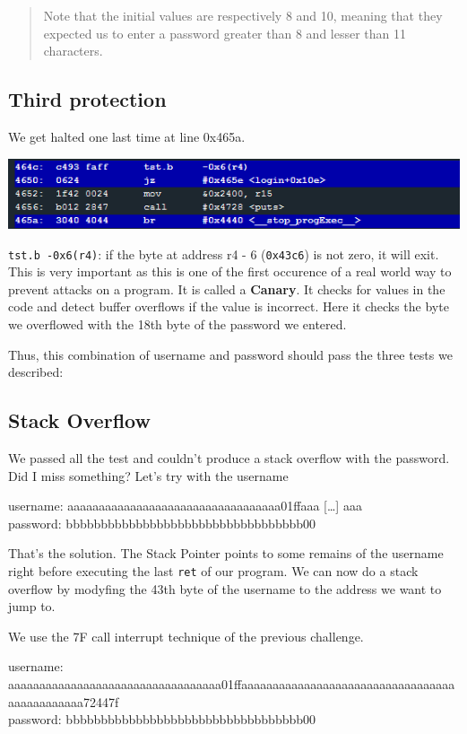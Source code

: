 \documentclass[a4paper,11pt]{article}
\begin{document}
\begin{quote}
Note that the initial values are respectively 8 and 10, meaning that
they expected us to enter a password greater than 8 and lesser than 11
characters.
\end{quote}

\subsection{Third protection}\label{third-protection}

We get halted one last time at line 0x465a.

\includegraphics{img/10_4.PNG}

\texttt{tst.b -0x6(r4)}: if the byte at address r4 - 6 (\texttt{0x43c6})
is not zero, it will exit. This is very important as this is one of the
first occurence of a real world way to prevent attacks on a program. It
is called a \textbf{Canary}. It checks for values in the code and detect
buffer overflows if the value is incorrect. Here it checks the byte we
overflowed with the 18th byte of the password we entered.

Thus, this combination of username and password should pass the three
tests we described:

\subsection{Stack Overflow}\label{stack-overflow}

We passed all the test and couldn't produce a stack overflow with the
password. Did I miss something? Let's try with the username

username: aaaaaaaaaaaaaaaaaaaaaaaaaaaaaaaaaa01ffaaa {[}\ldots{}{]}
aaa\\password: bbbbbbbbbbbbbbbbbbbbbbbbbbbbbbbbbb00

That's the solution. The Stack Pointer points to some remains of the
username right before executing the last \texttt{ret} of our program. We
can now do a stack overflow by modyfing the 43th byte of the username to
the address we want to jump to.

We use the 7F call interrupt technique of the previous challenge.

username:
aaaaaaaaaaaaaaaaaaaaaaaaaaaaaaaaaa01ffaaaaaaaaaaaaaaaaaaaaaaaaaaaaaaaaaaaaaaaaaaaaaa72447f\\password:
bbbbbbbbbbbbbbbbbbbbbbbbbbbbbbbbbb00
\end{document}
